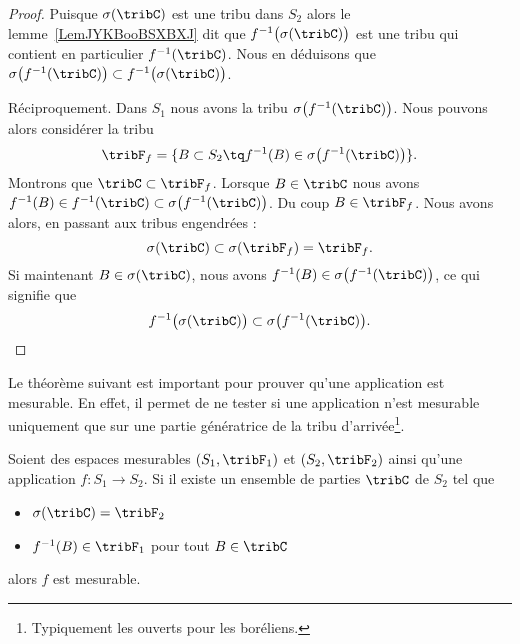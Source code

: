 \begin{proof}
	Puisque \( \sigma(\tribC)\) est une tribu dans \( S_2\) alors le lemme~\ref{LemJYKBooBSXBXJ} dit que \( f^{-1}\big( \sigma(\tribC) \big)\) est une tribu qui contient en particulier \(  f^{-1}(\tribC) \). Nous en déduisons que \( \sigma\big( f^{-1}(\tribC) \big)\subset f^{-1}\big( \sigma(\tribC) \big)\).

	Réciproquement. Dans \( S_1\) nous avons la tribu \( \sigma\big( f^{-1}(\tribC) \big)\). Nous pouvons alors considérer la tribu
	\begin{equation}
		\tribF_f=\{ B\subset S_2\tq f^{-1}(B)\in\sigma\big( f^{-1}(\tribC) \big) \}.
	\end{equation}
	Montrons que \( \tribC\subset \tribF_f\). Lorsque \( B\in \tribC\) nous avons \( f^{-1}(B)\in f^{-1}(\tribC)\subset\sigma\big( f^{-1}(\tribC) \big)\). Du coup \( B\in \tribF_f\). Nous avons alors, en passant aux tribus engendrées :
	\begin{equation}
		\sigma(\tribC)\subset\sigma(\tribF_f)=\tribF_f.
	\end{equation}
	Si maintenant \( B\in\sigma(\tribC)\), nous avons \( f^{-1}(B)\in \sigma\big( f^{-1}(\tribC) \big)\), ce qui signifie que
	\begin{equation}
		f^{-1}\big( \sigma(\tribC) \big)\subset\sigma\big( f^{-1}(\tribC) \big).
	\end{equation}
\end{proof}

Le théorème suivant est important pour prouver qu'une application est mesurable. En effet, il permet de ne tester si une application n'est mesurable uniquement que sur une partie génératrice de la tribu d'arrivée\footnote{Typiquement les ouverts pour les boréliens.}.
\begin{theorem}     \label{ThoECVAooDUxZrE}
	Soient des espaces mesurables \( ( S_1,\tribF_1 )\) et \( (S_2,\tribF_2)\) ainsi qu'une application \( f\colon S_1\to S_2\). Si il existe un ensemble de parties \( \tribC\) de \( S_2\) tel que
	\begin{itemize}
		\item \( \sigma(\tribC)=\tribF_2\)
		\item \( f^{-1}(B) \in \tribF_1 \) pour tout \( B\in \tribC\)
	\end{itemize}
	alors \( f\) est mesurable.
\end{theorem}

